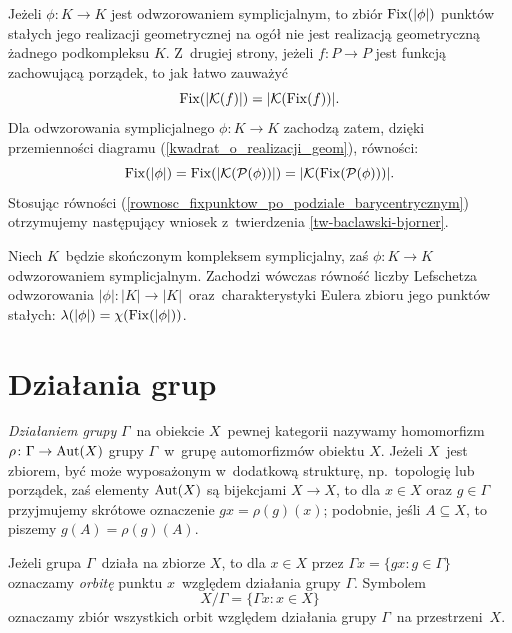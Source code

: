 Jeżeli $\phi\colon K\to K$ jest odwzorowaniem symplicjalnym, to zbiór $\operatorname{Fix}(|\phi|)$ punktów stałych jego realizacji geometrycznej na ogół nie jest realizacją geometryczną żadnego podkompleksu $K$. Z~drugiej strony, jeżeli $f\colon P\to P$ jest funkcją zachowującą porządek, to jak łatwo zauważyć \[\operatorname{Fix}(|\mathcal{K}(f)|)=|\mathcal{K}(\operatorname{Fix}(f))|.\]
 Dla odwzorowania symplicjalnego $\phi\colon K\to K$ zachodzą zatem, dzięki przemienności diagramu (\ref{kwadrat_o_realizacji_geom}), równości:
\begin{equation}\operatorname{Fix}(|\phi|)= \operatorname{Fix}(|\mathcal{K}(\mathcal{P}(\phi))|)=|\mathcal{K}(\operatorname{Fix}(\mathcal{P}(\phi)))|.\label{rownosc_fixpunktow_po_podziale_barycentrycznym}\end{equation}
Stosując równości (\ref{rownosc_fixpunktow_po_podziale_barycentrycznym}) otrzymujemy  następujący wniosek z~twierdzenia \ref{tw-baclawski-bjorner}.
\begin{wn}\label{wn-baclawski-bjorner}
Niech $K$~będzie skończonym kompleksem symplicjalny, zaś \mbox{$\phi\colon K\to K$} odwzorowaniem symplicjalnym. Zachodzi wówczas równość liczby Lefschetza odwzorowania $|\phi|\colon |K|\to |K|$~oraz~charakterystyki Eulera zbioru jego punktów stałych: $\lambda(|\phi|)=\chi(\operatorname{Fix}(|\phi|))$.
\end{wn}




\section{Działania grup}\label{sec-dzialania grup}
\textit{Działaniem grupy} $\Gamma$~na obiekcie $X$~pewnej kategorii nazywamy homomorfizm $\rho\colon \Gamma\to \operatorname{Aut}(X)$ grupy $\Gamma$~w~grupę automorfizmów obiektu $X$. Jeżeli $X$~jest zbiorem, być może wyposażonym w~dodatkową strukturę, np.~topologię lub porządek, zaś elementy $\operatorname{Aut}(X)$ są bijekcjami $X\to X$, to dla $x\in X$ oraz $g\in \Gamma$ przyjmujemy skrótowe oznaczenie $gx=\rho(g)(x)$; podobnie, jeśli $A\subseteq X$, to piszemy $g(A)=\rho(g)(A)$. 

Jeżeli grupa $\Gamma$~działa na zbiorze $X$, to dla $x\in X$ przez $\Gamma x=\{gx:g\in\Gamma\}$ oznaczamy \textit{orbitę} punktu $x$~względem działania grupy $\Gamma$. Symbolem \[X\big/\Gamma=\{\Gamma x:x\in X\}\] oznaczamy zbiór wszystkich orbit względem działania grupy $\Gamma$~na przestrzeni~$X$.

